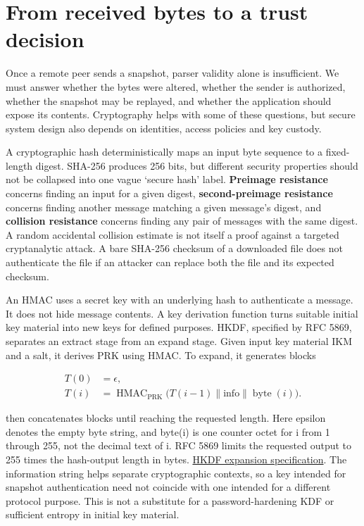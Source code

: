 \section{From received bytes to a trust decision}\label{06-engine-ii-ch042-from-received-bytes-to-a-trust-decision}

Once a remote peer sends a snapshot, parser validity alone is insufficient. We must answer whether the bytes were altered, whether the sender is authorized, whether the snapshot may be replayed, and whether the application should expose its contents. Cryptography helps with some of these questions, but secure system design also depends on identities, access policies and key custody.

A cryptographic hash deterministically maps an input byte sequence to a fixed-length digest. SHA-256 produces 256 bits, but different security properties should not be collapsed into one vague `secure hash' label. \textbf{Preimage resistance} concerns finding an input for a given digest, \textbf{second-preimage resistance} concerns finding another message matching a given message's digest, and \textbf{collision resistance} concerns finding any pair of messages with the same digest. A random accidental collision estimate is not itself a proof against a targeted cryptanalytic attack. A bare SHA-256 checksum of a downloaded file does not authenticate the file if an attacker can replace both the file and its expected checksum.

An HMAC uses a secret key with an underlying hash to authenticate a message. It does not hide message contents. A key derivation function turns suitable initial key material into new keys for defined purposes. HKDF, specified by RFC 5869, separates an extract stage from an expand stage. Given input key material IKM and a salt, it derives PRK using HMAC. To expand, it generates blocks

\[
\begin{aligned}
T(0)&=\epsilon,\\
T(i)&=\operatorname{HMAC}_{\mathrm{PRK}}
\bigl(T(i-1)\parallel\mathrm{info}\parallel\operatorname{byte}(i)\bigr).
\end{aligned}
\]

then concatenates blocks until reaching the requested length. Here epsilon denotes the empty byte string, and byte(i) is one counter octet for i from 1 through 255, not the decimal text of i. RFC 5869 limits the requested output to 255 times the hash-output length in bytes. \href{https://www.rfc-editor.org/rfc/rfc5869.html\#section-2.3}{HKDF expansion specification}. The information string helps separate cryptographic contexts, so a key intended for snapshot authentication need not coincide with one intended for a different protocol purpose. This is not a substitute for a password-hardening KDF or sufficient entropy in initial key material.

